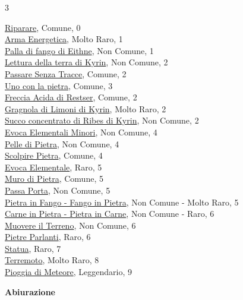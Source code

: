 \begin{multicols}{3}
{{\hyperlink{Riparare}{Riparare}, Comune, 0\\
\hyperlink{Arma Energetica}{Arma Energetica}, Molto Raro, 1\\
\hyperlink{Palla di fango di Eithne}{Palla di fango di Eithne}, Non Comune, 1\\
\hyperlink{Lettura della terra di Kyrin}{Lettura della terra di Kyrin}, Non Comune, 2\\
\hyperlink{Passare Senza Tracce}{Passare Senza Tracce}, Comune, 2\\
\hyperlink{Uno con la pietra}{Uno con la pietra}, Comune, 3\\
\hyperlink{Freccia Acida di Restser}{Freccia Acida di Restser}, Comune, 2\\
\hyperlink{Gragnola di Limoni di Kyrin}{Gragnola di Limoni di Kyrin}, Molto Raro, 2\\
\hyperlink{Succo concentrato di Ribes di Kyrin}{Succo concentrato di Ribes di Kyrin}, Non Comune, 2\\
\hyperlink{Evoca Elementali Minori}{Evoca Elementali Minori}, Non Comune, 4\\
\hyperlink{Pelle di Pietra}{Pelle di Pietra}, Non Comune, 4\\
\hyperlink{Scolpire Pietra}{Scolpire Pietra}, Comune, 4\\
\hyperlink{Evoca Elementale}{Evoca Elementale}, Raro, 5\\
\hyperlink{Muro di Pietra}{Muro di Pietra}, Comune, 5\\
\hyperlink{Passa Porta}{Passa Porta}, Non Comune, 5\\
\hyperlink{Pietra in Fango}{Pietra in Fango - Fango in Pietra}, Non Comune - Molto Raro, 5\\
\hyperlink{Carne in Pietra}{Carne in Pietra - Pietra in Carne}, Non Comune - Raro, 6\\
\hyperlink{Muovere il Terreno}{Muovere il Terreno}, Non Comune, 6\\
\hyperlink{Pietre Parlanti}{Pietre Parlanti}, Raro, 6\\
\hyperlink{Statua}{Statua}, Raro, 7\\
\hyperlink{Terremoto}{Terremoto}, Molto Raro, 8\\
\hyperlink{Pioggia di Meteore}{Pioggia di Meteore}, Leggendario, 9

\medskip\textbf{Abiurazione}

}}
\end{multicols}
